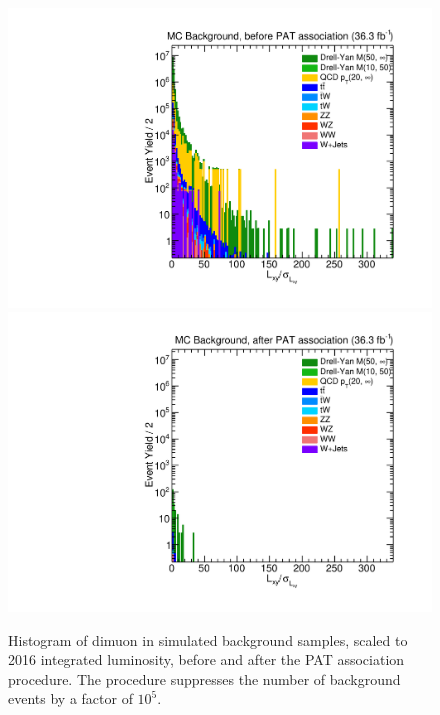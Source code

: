 \begin{figure}[p]
  \centering
  \includegraphics[width=\DSquareWidth]{figures/displaced/REPEFF_MC_LxySig-before.pdf}
  \hspace*{-2em}
  \includegraphics[width=\DSquareWidth]{figures/displaced/REPEFF_MC_LxySig-after.pdf}
  \caption[Histogram of dimuon \LxySig in simulated background samples before and after the PAT association procedure.]{Histogram of dimuon \LxySig in simulated background samples, scaled to 2016 integrated luminosity,  before and  after the PAT association procedure. The procedure suppresses the number of background events by a factor of $10^5$.}
  \label{fig:dd:REPEFF_MC_LxySig}
\end{figure}
